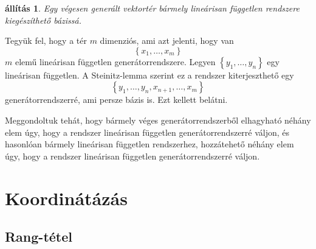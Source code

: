 \documentclass[9pt, showtrims]{memoir}
\makeatletter
\renewenvironment{proof}[1][\proofname]
    {\par\pushQED{\qed}%
    \normalfont \topsep6\p@\@plus6\p@\relax
    \trivlist
    \item[\hskip\labelsep
        \itshape
    #1\@addpunct{:}]\ignorespaces}
    {\popQED\endtrivlist\@endpefalse}
\theoremstyle{plain}
\newtheorem{proposition}{állítás}[section]
\theoremstyle{remark}
\theoremstyle{definition}
\makeatother
\begin{document}
\begin{proposition}
    Egy végesen generált vektortér bármely lineárisan független rendszere kiegészíthető bázissá.
    \label{pr:lfgtenbazissa}
\end{proposition}
\begin{proof}
    Tegyük fel, hogy a tér $m$ dimenziós, ami azt jelenti, hogy van 
    \[
        \left\{ x_1,\dots,x_m \right\}
    \]
    $m$ elemű lineárisan független generátorrendszere.
    Legyen $\left\{ y_1,\dots,y_n \right\}$ egy lineárisan független.
    A Steinitz-lemma szerint ez a rendszer kiterjeszthető egy 
    \[
        \left\{ y_1,\dots,y_n,x_{n+1},\dots,x_m \right\}
    \]
    generátorrendszerré, ami persze bázis is.
    Ezt kellett belátni. 
\end{proof}

Meggondoltuk tehát, hogy bármely véges generátorrendszerből elhagyható néhány elem úgy, 
hogy a rendszer lineárisan független generátorrendszerré váljon,
és hasonlóan bármely lineárisan független rendszerhez, hozzátehető néhány elem úgy, hogy a
rendszer lineárisan független generátorrendszerré váljon.





\chapter{Koordinátázás}
\section{Rang-tétel}
\end{document}
